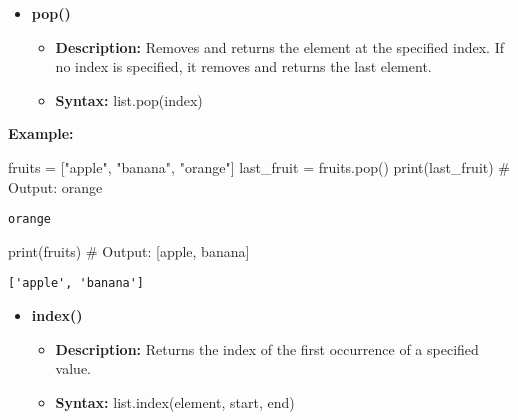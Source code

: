 \documentclass[
  letterpaper,
  DIV=11,
  numbers=noendperiod]{scrreprt}
\newenvironment{Shaded}{\begin{snugshade}}{\end{snugshade}}
\newcommand{\BuiltInTok}[1]{\textcolor[rgb]{0.00,0.23,0.31}{#1}}
\newcommand{\CommentTok}[1]{\textcolor[rgb]{0.37,0.37,0.37}{#1}}
\newcommand{\NormalTok}[1]{\textcolor[rgb]{0.00,0.23,0.31}{#1}}
\newcommand{\OperatorTok}[1]{\textcolor[rgb]{0.37,0.37,0.37}{#1}}
\newcommand{\StringTok}[1]{\textcolor[rgb]{0.13,0.47,0.30}{#1}}
\providecommand{\tightlist}{%
  \setlength{\itemsep}{0pt}\setlength{\parskip}{0pt}}
\begin{document}
\begin{itemize}
\tightlist
\item
  \textbf{pop()}

  \begin{itemize}
  \tightlist
  \item
    \textbf{Description:} Removes and returns the element at the
    specified index. If no index is specified, it removes and returns
    the last element.
  \item
    \textbf{Syntax:} list.pop(index)
  \end{itemize}
\end{itemize}

\textbf{Example:}

\begin{Shaded}
\begin{Highlighting}[]
\NormalTok{fruits }\OperatorTok{=}\NormalTok{ [}\StringTok{"apple"}\NormalTok{, }\StringTok{"banana"}\NormalTok{, }\StringTok{"orange"}\NormalTok{]}
\NormalTok{last\_fruit }\OperatorTok{=}\NormalTok{ fruits.pop()}
\BuiltInTok{print}\NormalTok{(last\_fruit)  }\CommentTok{\# Output: \textquotesingle{}orange\textquotesingle{}}
\end{Highlighting}
\end{Shaded}

\begin{verbatim}
orange
\end{verbatim}

\begin{Shaded}
\begin{Highlighting}[]
\BuiltInTok{print}\NormalTok{(fruits)      }\CommentTok{\# Output: [\textquotesingle{}apple\textquotesingle{}, \textquotesingle{}banana\textquotesingle{}]}
\end{Highlighting}
\end{Shaded}

\begin{verbatim}
['apple', 'banana']
\end{verbatim}

\begin{itemize}
\tightlist
\item
  \textbf{index()}

  \begin{itemize}
  \tightlist
  \item
    \textbf{Description:} Returns the index of the first occurrence of a
    specified value.
  \item
    \textbf{Syntax:} list.index(element, start, end)
  \end{itemize}
\end{itemize}
\end{document}
